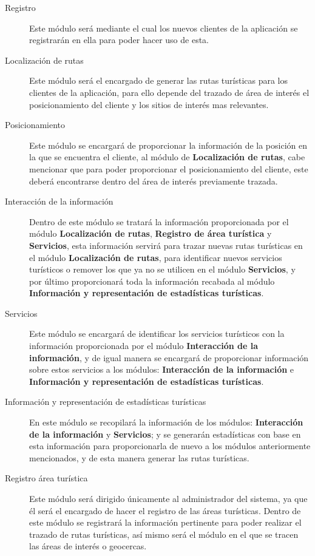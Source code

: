 \begin{description}
	\item[Registro] Este módulo será mediante el cual los nuevos clientes de la aplicación se registrarán en ella para poder hacer uso de esta. 
	
	\item[Localización de rutas] Este módulo será el encargado de generar las rutas turísticas para los clientes de la aplicación, para ello depende del trazado de área de interés el posicionamiento del cliente y los sitios de interés mas relevantes.
	
	\item [Posicionamiento] Este módulo se encargará de proporcionar la información de la posición en la que se encuentra el cliente, al módulo de \textbf{Localización de rutas}, cabe mencionar que para poder proporcionar el posicionamiento del cliente, este deberá encontrarse dentro del área de interés previamente trazada.
	
	\item [Interacción de la información] Dentro de este módulo se tratará la información proporcionada por el módulo \textbf{Localización de rutas}, \textbf{Registro de área turística} y \textbf{Servicios}, esta información servirá para trazar nuevas rutas turísticas en el módulo \textbf{Localización de rutas}, para identificar nuevos servicios turísticos o remover los que ya no se utilicen en el módulo \textbf{Servicios}, y por último proporcionará toda la información recabada al módulo \textbf{Información y representación de estadísticas turísticas}.
	
	\item [Servicios] Este módulo se encargará de identificar los servicios turísticos con la información proporcionada por el módulo \textbf{Interacción de la información}, y de igual manera se encargará de proporcionar información sobre estos servicios a los módulos: \textbf{Interacción de la información} e \textbf{Información y representación de estadísticas turísticas}.
	
	\item [Información y representación de estadísticas turísticas] En este módulo se recopilará la información de los módulos: \textbf{Interacción de la información} y \textbf{Servicios}; y se generarán estadísticas con base en esta información para proporcionarla de nuevo a los módulos anteriormente mencionados, y de esta manera generar las rutas turísticas.
	
	\item [Registro área turística] Este módulo será dirigido únicamente al administrador del sistema, ya que él será el encargado de hacer el registro de las áreas turísticas. Dentro de este módulo se registrará la información pertinente para poder realizar el trazado de rutas turísticas, así mismo será el módulo en el que se tracen las áreas de interés o geocercas.
\end{description}

